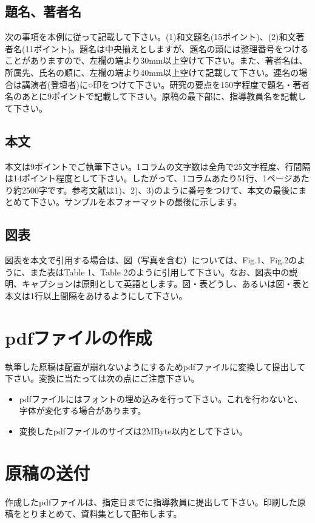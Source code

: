 \documentclass{proceedings}
\begin{document}
\begin{multicols}{2}
        \subsection{題名、著者名}
        次の事項を本例に従って記載して下さい。(1)和文題名(15ポイント)、(2)和文著者名(11ポイント)。題名は中央揃えとしますが、題名の頭には整理番号をつけることがありますので、左欄の端より30mm以上空けて下さい。また、著者名は、所属先、氏名の順に、左欄の端より40mm以上空けて記載して下さい。連名の場合は講演者(登壇者)に○印をつけて下さい。研究の要点を150字程度で題名・著者名のあとに9ポイントで記載して下さい。原稿の最下部に、指導教員名を記載して下さい。

        \subsection{本文}
        本文は9ポイントでご執筆下さい。1コラムの文字数は全角で25文字程度、行間隔は14ポイント程度として下さい。したがって、1コラムあたり51行、1ページあたり約2500字です。参考文献は1)、2)、3)のように番号をつけて、本文の最後にまとめて下さい。サンプルを本フォーマットの最後に示します。

        \subsection{図表}
        図表を本文で引用する場合は、図（写真を含む）については、Fig.1、Fig.2のように、また表はTable 1、Table 2のように引用して下さい。なお、図表中の説明、キャプションは原則として英語とします。図・表どうし、あるいは図・表と本文は1行以上間隔をあけるようにして下さい。

        \section{pdfファイルの作成}
        執筆した原稿は配置が崩れないようにするためpdfファイルに変換して提出して下さい。変換に当たっては次の点にご注意下さい。
            \begin{itemize}
                \item pdfファイルにはフォントの埋め込みを行って下さい。これを行わないと、字体が変化する場合があります。
                \item 変換したpdfファイルのサイズは2MByte以内として下さい。
            \end{itemize}

        \section{原稿の送付}
        作成したpdfファイルは、指定日までに指導教員に提出して下さい。印刷した原稿をとりまとめて、資料集として配布します。


\end{multicols}
\end{document}
